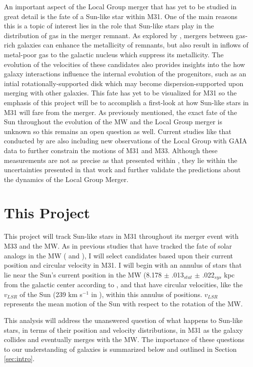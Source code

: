 \documentclass{aastex63}
\begin{document}
An important aspect of the Local Group merger that has yet to be studied in great detail is the fate of a Sun-like star within M31. One of the main reasons this is a topic of interest lies in the role that Sun-like stars play in the distribution of gas in the merger remnant. As explored by \cite{2012ApJ...746..108T}, mergers between gas-rich galaxies can enhance the metallicity of remnants, but also result in inflows of metal-poor gas to the galactic nucleus which suppress its metallicity. The evolution of the velocities of these candidates also provides insights into the how galaxy interactions influence the internal evolution of the progenitors, such as an intial rotationally-supported disk which may become dispersion-supported upon merging with other galaxies. This fate has yet to be visualized for M31 so the emphasis of this project will be to accomplish a first-look at how Sun-like stars in M31 will fare from the merger. As previously mentioned, the exact fate of the Sun throughout the evolution of the MW and the Local Group merger is unknown so this remains an open question as well. Current studies like that conducted by \cite{2019ApJ...872...24V} are also including new observations of the Local Group with GAIA data to further constrain the motions of M31 and M33. Although these measurements are not as precise as that presented within \citep{2012ApJ...753....9V}, they lie within the uncertainties presented in that work and further validate the predictions about the dynamics of the Local Group Merger.

\section{This Project} \label{sec:proposal}
This project will track Sun-like stars in M31 throughout its merger event with M33 and the MW. As in previous studies that have tracked the fate of solar analogs in the MW  (\cite{2012ApJ...753....9V} and \cite{2008MNRAS.386..461C}), I will select candidates based upon their current position and circular velocity in M31. I will begin with an annulus of stars that lie near the Sun's current position in the MW (8.178 $\pm$ .013$_{stat}$ $\pm$ .022$_{sys}$ kpc  from the galactic center according to \citep{2019A&A...625L..10G}, and that have circular velocities, like the $v_{LSR}$ of the Sun (239 km s$^{-1}$ in  \cite{2012ApJ...753....8V}), within this annulus of positions. $v_{LSR}$ represents the mean motion of the Sun with respect to the rotation of the MW.

This analysis will address the unanswered question of what happens to Sun-like stars, in terms of their position and velocity distributions, in M31 as the galaxy collides and eventually merges with the MW. The importance of these questions to our understanding of galaxies is summarized below and outlined in Section \ref{sec:intro}.
\end{document}
